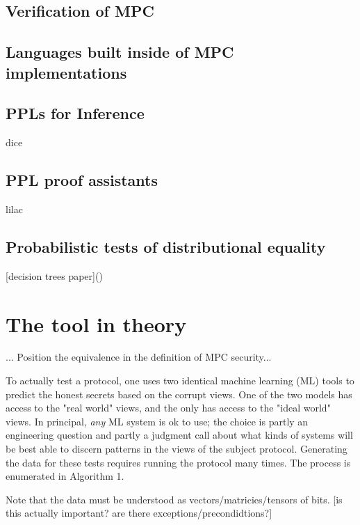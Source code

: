 \documentclass[conference]{IEEEtran}
\begin{document}
\subsection{Verification of MPC}


\subsection{Languages built inside of MPC implementations}

\subsection{PPLs for Inference}

dice

\subsection{PPL proof assistants}

lilac

\subsection{Probabilistic tests of distributional equality}

[decision trees paper]()

\section{The tool in theory}

... Position the equivalence in the definition of MPC security...

To actually test a protocol, one uses two identical machine learning (ML) tools to predict the honest secrets based on the corrupt views.
One of the two models has access to the "real world" views, and the only has access to the "ideal world" views.
In principal, \textit{any} ML system is ok to use; the choice is partly an engineering question
and partly a judgment call about what kinds of systems will be best able to discern patterns in the views of the subject protocol.
Generating the data for these tests requires running the protocol many times.
The process is enumerated in Algorithm 1.

Note that the data must be understood as vectors/matricies/tensors of bits. [is this actually important? are there exceptions/precondidtions?]
\end{document}
